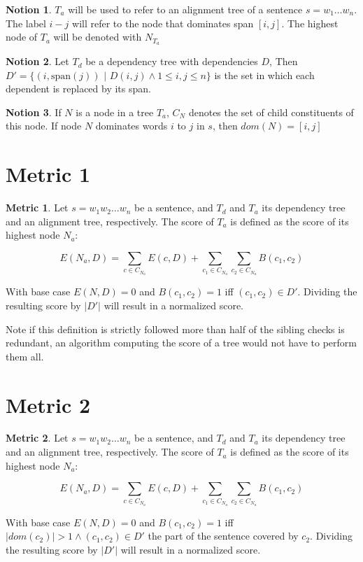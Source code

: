 \documentclass[a4paper, 11pt]{report}
\theoremstyle{definition}
\newtheorem{metric}{Metric}
\newtheorem{notion}{Notion}
\theoremstyle{plain}
\begin{document}
\begin{notion}
$T_a$ will be used to refer to an alignment tree of a sentence $s = w_1 \dots w_n$. The label $i-j$ will refer to the node that dominates span $[i,j]$. The highest node of $T_a$ will be denoted with $N_{T_a}$
\end{notion}

\begin{notion}
Let $T_d$ be a dependency tree with dependencies $D$, Then $D' = \{ (i,\textrm{span}(j))$ $|$ $D(i,j) \land 1 \leq i,j \leq n \}$ is the set in which each dependent is replaced by its span.
\end{notion}

\begin{notion}
If $N$ is a node in a tree $T_a$, $C_N$ denotes the set of child constituents of this node. If node $N$ dominates words $i$ to $j$ in $s$, then $dom(N)= [i,j]$
\end{notion}

\section{Metric 1}

\begin{metric}\label{m1}
Let $s = w_1 w_2 \dots w_n$ be a sentence, and $T_d$ and $T_a$ its dependency tree and an alignment tree, respectively. The score of $T_a$ is defined as the score of its highest node $N_{a}$:

$$
E(N_a,D) = \sum_{c\in C_{N_a}} E(c,D)+ \sum_{c_1\in C_{N_a}} \sum_{c_2\in C_{N_a}} B(c_1,c_2)
$$

\noindent With base case $E(N,D) = 0$ and $B(c_1,c_2) = 1$ iff  $(c_1,c_2)\in D'$. Dividing the resulting score by $|D'|$ will result in a normalized score.
\end{metric}

\noindent  Note if this definition is strictly followed more than half of the sibling checks is redundant, an algorithm computing the score of a tree would not have to perform them all.

\section{Metric 2}

\begin{metric}\label{m2}
Let $s = w_1 w_2 \dots w_n$ be a sentence, and $T_d$ and $T_a$ its dependency tree and an alignment tree, respectively. The score of $T_a$ is defined as the score of its highest node $N_{a}$:

$$
E(N_a,D) = \sum_{c\in C_{N_a}} E(c,D)+ \sum_{c_1\in C_{N_a}} \sum_{c_2\in C_{N_a}} B(c_1,c_2)
$$

\noindent With base case $E(N,D) = 0$ and $B(c_1,c_2) = 1$ iff  $|dom(c_2)| > 1 \land (c_1,c_2)\in D'$ the part of the sentence covered by $c_2$. Dividing the resulting score by $|D'|$ will result in a normalized score.
\end{metric}
\end{document}
